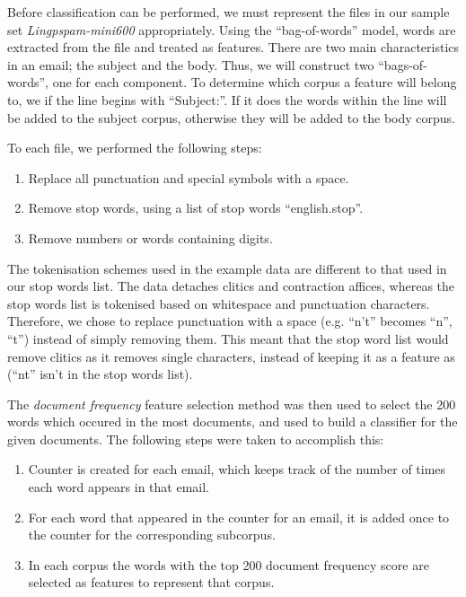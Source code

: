 \documentclass[10pt, a4paper]{article}
\begin{document}

Before classification can be performed, we must represent the files in our sample set \emph{Lingpspam-mini600} appropriately. Using the ``bag-of-words'' model, words are extracted from the file and treated as features. There are two main characteristics in an email; the subject and the body. Thus, we will construct two ``bags-of-words'', one for each component. To determine which corpus a feature will belong to, we if the line begins with ``Subject:''. If it does the words within the line will be added to the subject corpus, otherwise they will be added to the body corpus.

To each file, we performed the following steps:

\begin{enumerate}
	\item Replace all punctuation and special symbols with a space.
	\item Remove stop words, using a list of stop words ``english.stop''.
	\item Remove numbers or words containing digits.
\end{enumerate}

The tokenisation schemes used in the example data are different to that used in our stop words list. The data detaches clitics and contraction affices, whereas the stop words list is tokenised based on whitespace and punctuation characters. Therefore, we chose to replace punctuation with a space (e.g. ``n't'' becomes ``n'', ``t'') instead of simply removing them. This meant that the stop word list would remove clitics as it removes single characters, instead of keeping it as a feature as (``nt'' isn't in the stop words list).

The \emph{document frequency} feature selection method was then used to select the 200 words which occured in the most documents, and used to build a classifier for the given documents. The following steps were taken to accomplish this:

\begin{enumerate}
\item Counter is created for each email, which keeps track of the number of times each word appears in that email.
\item For each word that appeared in the counter for an email, it is added once to the counter for the corresponding subcorpus.
\item In each corpus the words with the top 200 document frequency score are selected as features to represent that corpus.
\end{enumerate}
\end{document}
